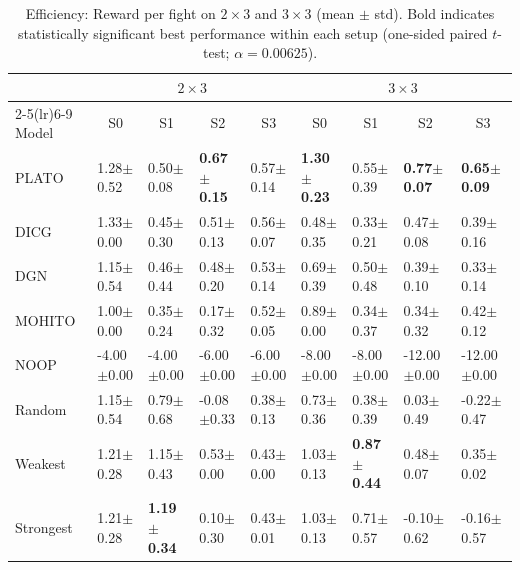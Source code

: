\begin{table}[!t]
\centering
\small
\setlength{\tabcolsep}{1.4pt}
\renewcommand{\arraystretch}{1.02}
\begin{tabular}{@{\hspace{2pt}}l|l|l|l|l||l|l|l|l@{\hspace{2pt}}}
\toprule
& \multicolumn{4}{c||}{$2\times 3$} & \multicolumn{4}{c}{$3\times 3$} \\
\cmidrule(lr){2-5}\cmidrule(lr){6-9}
Model & \multicolumn{1}{c|}{S0} & \multicolumn{1}{c|}{S1} & \multicolumn{1}{c|}{S2} & \multicolumn{1}{c||}{S3}
      & \multicolumn{1}{c|}{S0} & \multicolumn{1}{c|}{S1} & \multicolumn{1}{c|}{S2} & \multicolumn{1}{c}{S3} \\
\midrule
PLATO & 1.28$\pm$0.52 & 0.50$\pm$0.08 & \textbf{0.67$\pm$0.15} & 0.57$\pm$0.14
 & \textbf{1.30$\pm$0.23} & 0.55$\pm$0.39 & \textbf{0.77$\pm$0.07} & \textbf{0.65$\pm$0.09} \\
DICG & 1.33$\pm$0.00 & 0.45$\pm$0.30 & 0.51$\pm$0.13 & 0.56$\pm$0.07
& 0.48$\pm$0.35 & 0.33$\pm$0.21 & 0.47$\pm$0.08 & 0.39$\pm$0.16 \\
DGN & 1.15$\pm$0.54 & 0.46$\pm$0.44 & 0.48$\pm$0.20 & 0.53$\pm$0.14
& 0.69$\pm$0.39 & 0.50$\pm$0.48 & 0.39$\pm$0.10 & 0.33$\pm$0.14 \\
MOHITO  & 1.00$\pm$0.00 & 0.35$\pm$0.24 & 0.17$\pm$0.32 & 0.52$\pm$0.05
& 0.89$\pm$0.00 & 0.34$\pm$0.37 & 0.34$\pm$0.32 & 0.42$\pm$0.12 \\
NOOP & -4.00$\pm$0.00 & -4.00$\pm$0.00 & -6.00$\pm$0.00 & -6.00$\pm$0.00
    & -8.00$\pm$0.00 & -8.00$\pm$0.00 & -12.00$\pm$0.00 & -12.00$\pm$0.00 \\
Random & 1.15$\pm$0.54 & 0.79$\pm$0.68 & -0.08$\pm$0.33 & 0.38$\pm$0.13
    & 0.73$\pm$0.36 & 0.38$\pm$0.39 & 0.03$\pm$0.49 & -0.22$\pm$0.47 \\
Weakest & 1.21$\pm$0.28 & 1.15$\pm$0.43 & 0.53$\pm$0.00 & 0.43$\pm$0.00
    & 1.03$\pm$0.13 & \textbf{0.87$\pm$0.44} & 0.48$\pm$0.07 & 0.35$\pm$0.02 \\
Strongest & 1.21$\pm$0.28 & \textbf{1.19$\pm$0.34} & 0.10$\pm$0.30 & 0.43$\pm$0.01
& 1.03$\pm$0.13 & 0.71$\pm$0.57 & -0.10$\pm$0.62 & -0.16$\pm$0.57 \\

\bottomrule
\end{tabular}
\caption{Efficiency: Reward per fight on $2\times 3$ and $3\times 3$ (mean $\pm$ std). Bold indicates statistically significant best performance within each setup (one-sided paired $t$-test; $\alpha=0.00625$).}
\label{tab:rpf_2x3_3x3}
\end{table}

